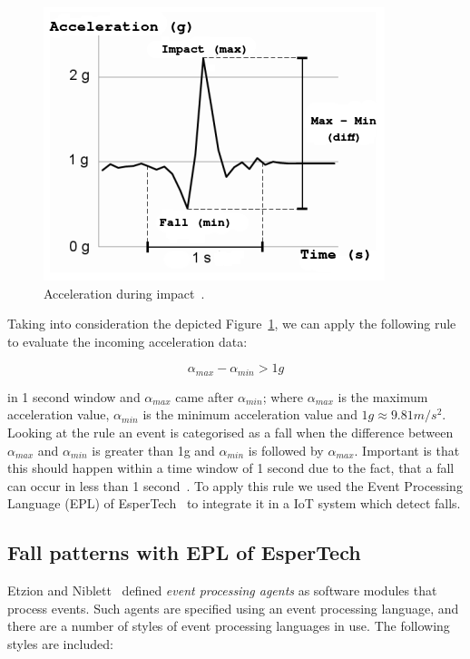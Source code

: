 \documentclass[conference]{IEEEtran}
\theoremstyle{definition}
\begin{document}
\begin{figure}[!h]
  \centering
  \includegraphics[scale=0.8]{img/FallGraph}
  \caption[Acceleration during impact]{Acceleration during impact~\cite{Kozina}.}
  \label{fig:grafica}
\end{figure}

Taking into consideration the depicted Figure~\ref{fig:grafica}, we can apply the following rule to evaluate the incoming acceleration data:

\begin{equation}\label{eq:caida}
 \alpha_{max} - \alpha_{min} > 1g
\end{equation}

in 1 second window and $\alpha_{max}$ came after $\alpha_{min}$; where $\alpha_{max}$ is the maximum acceleration value, 
$\alpha_{min}$ is the minimum acceleration value and $1g\approx9.81m/s^{2}$. Looking at the rule an event is categorised as a fall when the 
difference between $\alpha_{max}$ and $\alpha_{min}$ is greater than 1g and $\alpha_{min}$ is followed by $\alpha_{max}$. 
Important is that this should happen within a time window of 1 second due to the fact, that a fall can occur in less than 1 second~\cite{Luder2009}.
To apply this rule we used the Event Processing Language (EPL) of EsperTech~\cite{Esper:2016} to integrate it in a IoT system which detect falls.

\subsection{Fall patterns with EPL of EsperTech}

Etzion and Niblett~\cite{Etz10} defined \textit{event processing agents} as software modules that process events. Such agents are specified using an 
event processing language, and there are a number of styles of event processing languages in use. The following styles are included:
\end{document}
